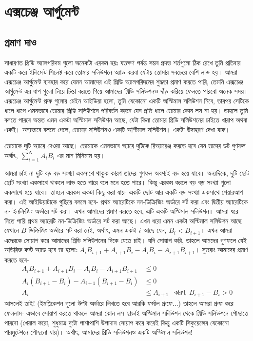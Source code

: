 \chapter{এক্সচেঞ্জ আর্গুমেন্ট}

\section{প্রমাণ দাও}

সাধারণত গ্রিডি অ্যালগরিদম গুলো অনেকটা এরকম হয়ঃ যতক্ষণ পর্যন্ত সম্ভব প্রদত্ত শর্তগুলো ঠিক রেখে তুমি প্রতিবার একটি করে ইলিমেন্ট সিলেক্ট করে তোমার সলিউশনে অ্যাড করবা যেটায় তোমার সবচেয়ে বেশি লাভ হয়। আমরা এক্সচেঞ্জ আর্গুমেন্ট ব্যবহার করে যেমন আমাদের এই গ্রিডি অ্যালগরিদমের শুদ্ধতা প্রমাণ করতে পারি, তেমনি এক্সচেঞ্জ আর্গুমেন্ট এর ধাপ গুলো নিয়ে চিন্তা করতে গিয়ে আমাদের গ্রিডি সলিউশনও দাঁড় করিয়ে ফেলতে পারবো অনেক সময়। এক্সচেঞ্জ আর্গুমেন্ট প্রুফ গুলোর মেইন আইডিয়া হলো, তুমি যেকোনো একটি অপ্টিমাল সলিউশন নিবে, তারপর সেটিকে ধাপে ধাপে এমনভাবে তোমার গ্রিডি সলিউশনে পরিবর্তন করবে যেন প্রতি ধাপে তোমার কোন লস না হয়। তাহলে তুমি বলতে পারবে অন্তত এমন একটা অপ্টিমাল সলিউশন আছে, যেটা কিনা তোমার গ্রিডি সলিউশনের চাইতে খারাপ অথবা একই। অন্যভাবে বলতে গেলে, তোমার সলিউশনও একটি অপ্টিমাল সলিউশন। একটা উদাহরণ দেখা যাক।

\begin{example}[ডট প্রডাক্ট মিনিমাইজেশন]
তোমাকে দুটি অ্যারে দেওয়া আছে। তোমাকে এমনভাবে অ্যারে দুটিকে রিঅ্যারেঞ্জ করতে হবে যেন তাদের ডট গুণফল অর্থাৎ, $\sum_{i=1}^{N} A_i B_i$ এর মান মিনিমাম হয়।
\end{example}
\begin{solution}
আমরা চাই না দুটি বড় বড় সংখ্যা একসাথে থাকুক কারণ তাদের গুণফল অবশ্যই বড় হয়ে যাবে। অন্যদিকে, দুটি ছোট ছোট সংখ্যা একসাথে থাকলে লাভ হতে পারে বলে মনে হতে পারে। কিন্তু এরকম করলে বড় বড় সংখ্যা গুলো একসাথে হয়ে যাবে। তাহলে এরকম একটা কিছু করা যায়- একটি ছোট আর একটি বড় সংখ্যা একসাথে পেয়ারআপ করা। এই আইডিয়াটাকে গুছিয়ে বললে হবে- প্রথম অ্যারেটিকে নন-ডিক্রিজিং অর্ডারে সর্ট করা এবং দ্বিতীয় অ্যারেটিকে নন-ইনক্রিজিং অর্ডারে সর্ট করা। এখন আমাদের প্রমাণ করতে হবে, এটি একটি অপ্টিমাল সলিউশন। আমরা ধরে নিতে পারি প্রথম অ্যারেটি নন-ডিক্রিজিং অর্ডারে সর্ট করা আছে। এখন ধরো এমন একটা অপ্টিমাল সলিউশন আছে যেখানে $B$ ডিক্রিজিং অর্ডারে সর্ট করা নেই, অর্থাৎ, এমন একটা $i$ আছে যেন, $B_{i} < B_{i+1}$।  এখন আমরা এদেরকে সোয়াপ করে আমাদের গ্রিডি সলিউশনের দিকে যেতে চাই। যদি সোয়াপ করি, তাহলে আমদের গুণফলে যেই অতিরিক্ত কস্ট অ্যাড হবে তা হলোঃ $A_iB_{i+1} + A_{i+1}B_i - A_iB_i - A_{i+1}B_{i+1}$।  সুতরাং আমাদের প্রমাণ করতে হবে-
\begin{align*}
	A_iB_{i+1} + A_{i+1}B_i - A_iB_i - A_{i+1}B_{i+1} &\le 0 & \\
	A_i(B_{i+1} - B_i) - A_{i+1}(B_{i+1} - B_i) &\le 0\\
	A_i &\le A_{i+1} &\text{কারণ, $B_{i+1} - B_i > 0$}
\end{align*}
আসলেই তাই! (ইমপ্লিকেশন গুলো উল্টা অর্ডারে লিখতে হবে আরকি ফর্মাল প্রুফে...) তাহলে আমরা প্রুফ করে ফেললাম- এভাবে সোয়াপ করতে থাকলে আমরা কোন লস ছাড়াই অপ্টিমাল সলিউশন থেকে গ্রিডি সলিউশনে পৌছাতে পারবো (খেয়াল করো, শুধুমাত্র দুটো পাশাপাশি উপাদান সোয়াপ করে করেই কিন্তু একটি সিকুয়েন্সের যেকোনো পারমুটেশনে পৌছনো যায়)। অর্থাৎ, আমাদের গ্রিডি সলিউশনও একটি অপ্টিমাল সলিউশন!
\end{solution}

